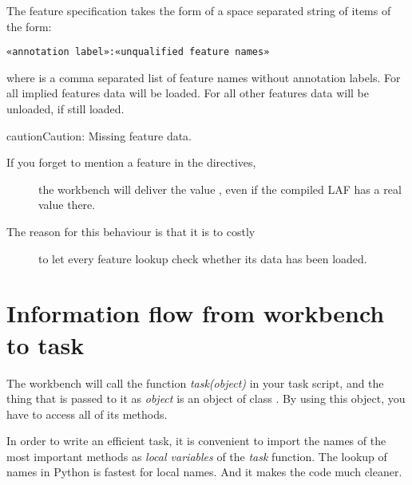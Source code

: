 \documentclass[letterpaper,10pt,english]{sphinxmanual}
\begin{document}
The feature specification takes the form of a space separated string of items of the form:

\begin{Verbatim}[commandchars=\\\{\}]
«annotation label»:«unqualified feature names»
\end{Verbatim}

where  is a comma separated list of feature names without annotation labels.
For all implied features  data will be loaded.
For all other features data will be unloaded, if still loaded.

\begin{notice}{caution}{Caution:}
Missing feature data.
\begin{description}
\item[{If you forget to mention a feature in the directives,}] \leavevmode
the workbench will deliver the value ,
even if the compiled LAF has a real value there.

\item[{The reason for this behaviour is that it is to costly}] \leavevmode
to let every feature lookup check whether its data has been loaded.

\end{description}
\end{notice}


\section{Information flow from workbench to task}
\label{taskwriting:information-flow-from-workbench-to-task}
The workbench will call the function \emph{task(object)} in your task script,
and the thing that is passed to it as \emph{object} is an object of
class {\hyperref[graf/graf:graf.task.GrafTask]{}}.
By using this object, you have to access all of its methods.

In order to write an efficient task,
it is convenient to import the names of the most important methods as \emph{local variables} of the \emph{task} function.
The lookup of names in Python is fastest for local names.
And it makes the code much cleaner.
\end{document}
